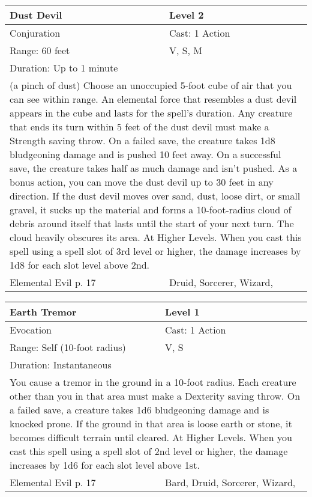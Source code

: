\documentclass[11pt]{report}
\begin{document}
\begin{table}[H]
	\begin{tabular}{||p{6cm}|p{6cm}||}
		\hline\hline
		\bf{Dust Devil} & Level 2\\ \hline
		Conjuration & Cast: 1 Action\\ \hline
		Range: 60 feet & V, S, M\\ \hline
		Duration: Up to 1 minute & \\ \hline
		\multicolumn{2}{||p{12cm}||}{(a pinch of dust)
Choose an unoccupied 5-foot cube of air that you can see within range. An elemental force that resembles a dust devil appears in the cube and lasts for the spell’s duration.
Any creature that ends its turn within 5 feet of the dust devil must make a Strength saving throw. On a failed save, the creature takes 1d8 bludgeoning damage and is pushed 10 feet away. On a successful save, the creature takes half as much damage and isn’t pushed.
As a bonus action, you can move the dust devil up to 30 feet in any direction. If the dust devil moves over sand, dust, loose dirt, or small gravel, it sucks up the material and forms a 10-foot-radius cloud of debris around itself that lasts until the start of your next turn. The cloud heavily obscures its area.
At Higher Levels. When you cast this spell using a spell slot of 3rd level or higher, the damage increases by 1d8 for each slot level above 2nd.}\\ \hline
Elemental Evil p. 17 & Druid, Sorcerer, Wizard, \\ \hline\hline
	\end{tabular}
\end{table}

\begin{table}[H]
	\begin{tabular}{||p{6cm}|p{6cm}||}
		\hline\hline
		\bf{Earth Tremor } & Level 1\\ \hline
		Evocation & Cast: 1 Action\\ \hline
		Range: Self (10-foot radius) & V, S\\ \hline
		Duration: Instantaneous & \\ \hline
		\multicolumn{2}{||p{12cm}||}{You cause a tremor in the ground in a 10-foot radius. Each creature other than you in that area must make a Dexterity saving throw. On a failed save, a creature takes 1d6 bludgeoning damage and is knocked prone. If the ground in that area is loose earth or stone, it becomes difficult terrain until cleared. At Higher Levels. When you cast this spell using a spell slot of 2nd level or higher, the damage increases by 1d6 for each slot level above 1st.}\\ \hline
Elemental Evil p. 17 & Bard, Druid, Sorcerer, Wizard, \\ \hline\hline
	\end{tabular}
\end{table}
\end{document}
